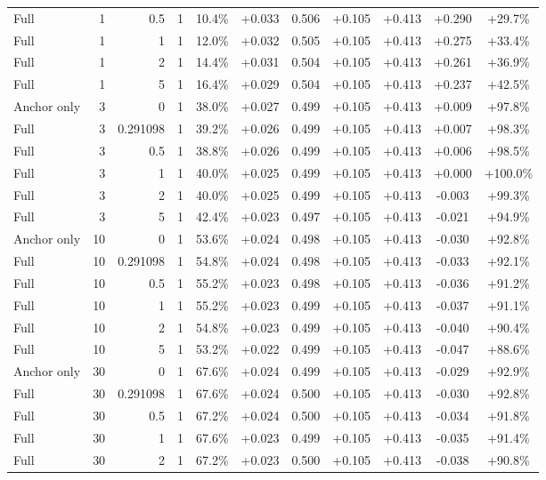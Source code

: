 \begin{table}[htbp]
\begin{tabular}{lrrrccccccc}
Full & 1 & 0.5 & 1 & 10.4\% & +0.033 & 0.506 & +0.105 & +0.413 & +0.290 & +29.7\% \\
Full & 1 & 1 & 1 & 12.0\% & +0.032 & 0.505 & +0.105 & +0.413 & +0.275 & +33.4\% \\
Full & 1 & 2 & 1 & 14.4\% & +0.031 & 0.504 & +0.105 & +0.413 & +0.261 & +36.9\% \\
Full & 1 & 5 & 1 & 16.4\% & +0.029 & 0.504 & +0.105 & +0.413 & +0.237 & +42.5\% \\
Anchor only & 3 & 0 & 1 & 38.0\% & +0.027 & 0.499 & +0.105 & +0.413 & +0.009 & +97.8\% \\
Full & 3 & 0.291098 & 1 & 39.2\% & +0.026 & 0.499 & +0.105 & +0.413 & +0.007 & +98.3\% \\
Full & 3 & 0.5 & 1 & 38.8\% & +0.026 & 0.499 & +0.105 & +0.413 & +0.006 & +98.5\% \\
Full & 3 & 1 & 1 & 40.0\% & +0.025 & 0.499 & +0.105 & +0.413 & +0.000 & +100.0\% \\
Full & 3 & 2 & 1 & 40.0\% & +0.025 & 0.499 & +0.105 & +0.413 & -0.003 & +99.3\% \\
Full & 3 & 5 & 1 & 42.4\% & +0.023 & 0.497 & +0.105 & +0.413 & -0.021 & +94.9\% \\
Anchor only & 10 & 0 & 1 & 53.6\% & +0.024 & 0.498 & +0.105 & +0.413 & -0.030 & +92.8\% \\
Full & 10 & 0.291098 & 1 & 54.8\% & +0.024 & 0.498 & +0.105 & +0.413 & -0.033 & +92.1\% \\
Full & 10 & 0.5 & 1 & 55.2\% & +0.023 & 0.498 & +0.105 & +0.413 & -0.036 & +91.2\% \\
Full & 10 & 1 & 1 & 55.2\% & +0.023 & 0.499 & +0.105 & +0.413 & -0.037 & +91.1\% \\
Full & 10 & 2 & 1 & 54.8\% & +0.023 & 0.499 & +0.105 & +0.413 & -0.040 & +90.4\% \\
Full & 10 & 5 & 1 & 53.2\% & +0.022 & 0.499 & +0.105 & +0.413 & -0.047 & +88.6\% \\
Anchor only & 30 & 0 & 1 & 67.6\% & +0.024 & 0.499 & +0.105 & +0.413 & -0.029 & +92.9\% \\
Full & 30 & 0.291098 & 1 & 67.6\% & +0.024 & 0.500 & +0.105 & +0.413 & -0.030 & +92.8\% \\
Full & 30 & 0.5 & 1 & 67.2\% & +0.024 & 0.500 & +0.105 & +0.413 & -0.034 & +91.8\% \\
Full & 30 & 1 & 1 & 67.6\% & +0.023 & 0.499 & +0.105 & +0.413 & -0.035 & +91.4\% \\
Full & 30 & 2 & 1 & 67.2\% & +0.023 & 0.500 & +0.105 & +0.413 & -0.038 & +90.8\% \\

\end{tabular}
\end{table}
